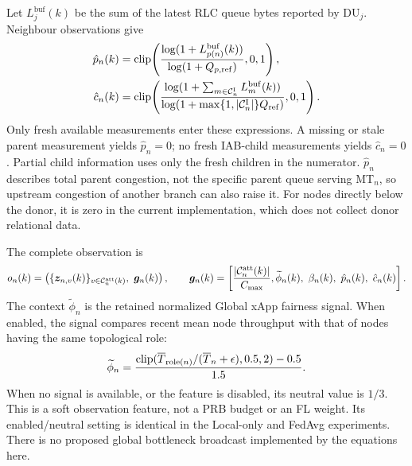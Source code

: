 \begin{EnChapter}
Let $L_j^{\mathrm{buf}}(k)$ be the sum of the latest RLC queue bytes reported by
DU$_j$. Neighbour observations give
\begin{align}
  \hat p_n(k)&=\operatorname{clip}\!\left(
       \frac{\log(1+L_{p(n)}^{\mathrm{buf}}(k))}
            {\log(1+Q_{p,\mathrm{ref}})},0,1\right),
  \label{eq:phat}\\
  \hat c_n(k)&=\operatorname{clip}\!\left(
       \frac{\log(1+\sum_{m\in\mathcal{C}_n^{\mathrm{I}}}L_m^{\mathrm{buf}}(k))}
            {\log(1+\max\{1,|\mathcal{C}_n^{\mathrm{I}}|\}Q_{\mathrm{ref}})},0,1\right).
  \label{eq:chat}
\end{align}
Only fresh available measurements enter these expressions. A missing or stale
parent measurement yields $\hat p_n=0$; no fresh IAB-child measurements yields
$\hat c_n=0$. Partial child information uses only the fresh children in the
numerator. $\hat p_n$ describes total parent congestion, not the specific parent
queue serving MT$_n$, so upstream congestion of another branch can also raise it.
For nodes directly below the donor, it is zero in the current implementation,
which does not collect donor relational data.

The complete observation is
\begin{equation}
  o_n(k)=\left(\{\bm z_{n,v}(k)\}_{v\in\mathcal{C}_n^{\mathrm{att}}(k)},\ \bm g_n(k)\right),
  \qquad
  \bm g_n(k)=\left[\frac{|\mathcal{C}_n^{\mathrm{att}}(k)|}{C_{\max}},
                  \widetilde\phi_n(k),\ \beta_n(k),\ \hat p_n(k),\ \hat c_n(k)\right].
  \label{eq:observation}
\end{equation}
The context $\widetilde\phi_n$ is the retained normalized Global xApp fairness
signal. When enabled, the signal compares recent mean node throughput with that
of nodes having the same topological role:
\begin{equation}
  \widetilde\phi_n=
  \frac{\operatorname{clip}(\overline T_{\mathrm{role}(n)}/(\overline T_n+\epsilon),0.5,2)-0.5}{1.5}.
  \label{eq:fairness-feature}
\end{equation}
When no signal is available, or the feature is disabled, its neutral value is
$1/3$. This is a soft observation feature, not a PRB budget or an FL weight.
Its enabled/neutral setting is identical in the Local-only and FedAvg experiments.
There is no proposed global bottleneck broadcast implemented by the equations here.


\end{EnChapter}
